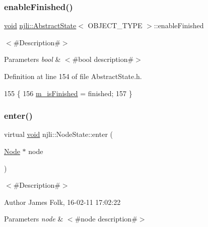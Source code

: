 \subsubsection{\texorpdfstring{enable\+Finished()}{enableFinished()}}
{\footnotesize\ttfamily \mbox{\hyperlink{_thread_8h_af1e856da2e658414cb2456cb6f7ebc66}{void}} \mbox{\hyperlink{classnjli_1_1_abstract_state}{njli\+::\+Abstract\+State}}$<$ O\+B\+J\+E\+C\+T\+\_\+\+T\+Y\+PE $>$\+::enable\+Finished}

$<$\#\+Description\#$>$


\begin{DoxyParams}{Parameters}
{\em bool} & $<$\#bool description\#$>$ \\
\hline
\end{DoxyParams}


Definition at line 154 of file Abstract\+State.\+h.


\begin{DoxyCode}
155   \{
156     \mbox{\hyperlink{classnjli_1_1_abstract_state_a445a5d1ac7572b8b01b81937c89e960c}{m\_isFinished}} = finished;
157   \}
\end{DoxyCode}
\mbox{\label{classnjli_1_1_node_state_ae2e27ccb73406c40bd502c5684bf62b0}} 
\subsubsection{\texorpdfstring{enter()}{enter()}}
{\footnotesize\ttfamily virtual \mbox{\hyperlink{_thread_8h_af1e856da2e658414cb2456cb6f7ebc66}{void}} njli\+::\+Node\+State\+::enter (\begin{DoxyParamCaption}\item[{\mbox{\hyperlink{classnjli_1_1_node}{Node}} $\ast$}]{node }\end{DoxyParamCaption})\hspace{0.3cm}{\ttfamily [virtual]}}



$<$\#\+Description\#$>$ 

\begin{DoxyAuthor}{Author}
James Folk, 16-\/02-\/11 17\+:02\+:22
\end{DoxyAuthor}

\begin{DoxyParams}{Parameters}
{\em node} & $<$\#node description\#$>$ \\
\hline
\end{DoxyParams}



